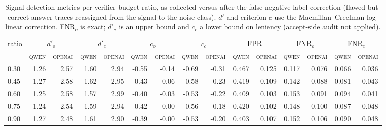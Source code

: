\begin{table}[t]
\centering
\caption{Signal-detection metrics per verifier budget ratio, as collected versus after the false-negative label correction (flawed-but-correct-answer traces reassigned from the signal to the noise class). $d'$ and criterion $c$ use the Macmillan--Creelman log-linear correction. FNR$_c$ is exact; $d'_c$ is an upper bound and $c_c$ a lower bound on leniency (accept-side audit not applied).}
\label{tab:sdt_corrected}
\small
\begin{tabular}{l*{14}{r}}
\toprule
ratio & \multicolumn{2}{c}{$d'_o$} & \multicolumn{2}{c}{$d'_c$} & \multicolumn{2}{c}{$c_o$} & \multicolumn{2}{c}{$c_c$} & \multicolumn{2}{c}{FPR} & \multicolumn{2}{c}{FNR$_o$} & \multicolumn{2}{c}{FNR$_c$} \\
\cmidrule(lr){2-3} \cmidrule(lr){4-5} \cmidrule(lr){6-7} \cmidrule(lr){8-9} \cmidrule(lr){10-11} \cmidrule(lr){12-13} \cmidrule(lr){14-15}
 & \textsc{qwen} & \textsc{openai} & \textsc{qwen} & \textsc{openai} & \textsc{qwen} & \textsc{openai} & \textsc{qwen} & \textsc{openai} & \textsc{qwen} & \textsc{openai} & \textsc{qwen} & \textsc{openai} & \textsc{qwen} & \textsc{openai} \\
\midrule
0.30 & 1.26 & 2.57 & 1.60 & 2.94 & -0.55 & -0.14 & -0.69 & -0.31 & 0.467 & 0.125 & 0.117 & 0.076 & 0.066 & 0.036 \\
0.45 & 1.27 & 2.58 & 1.62 & 2.95 & -0.43 & -0.06 & -0.58 & -0.23 & 0.419 & 0.109 & 0.142 & 0.088 & 0.081 & 0.043 \\
0.60 & 1.25 & 2.58 & 1.57 & 2.99 & -0.40 & -0.03 & -0.53 & -0.22 & 0.409 & 0.103 & 0.153 & 0.091 & 0.094 & 0.041 \\
0.75 & 1.24 & 2.54 & 1.59 & 2.94 & -0.42 & -0.00 & -0.56 & -0.18 & 0.420 & 0.102 & 0.148 & 0.100 & 0.087 & 0.048 \\
0.90 & 1.27 & 2.48 & 1.61 & 2.90 & -0.39 & -0.00 & -0.53 & -0.20 & 0.403 & 0.107 & 0.152 & 0.106 & 0.090 & 0.048 \\
\bottomrule
\end{tabular}
\end{table}
